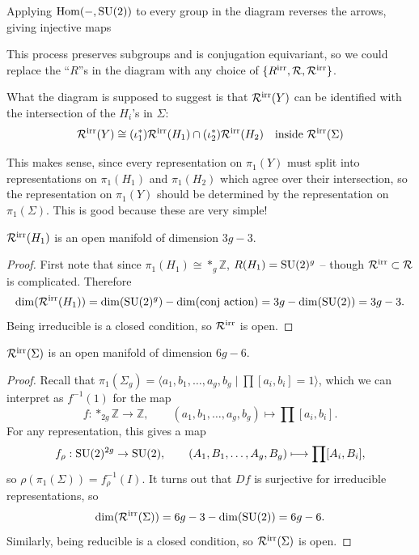 \documentclass[main]{subfiles}
\begin{document}
Applying $\mathrm{Hom}(-,\operatorname{SU}(2))$ to every group in the diagram reverses the arrows, giving injective maps
\begin{center}
\end{center}
This process preserves subgroups and is conjugation equivariant, so we could replace the ``$R$''s in the diagram with any choice of $\{R^{\mathrm{irr}}, \mathcal{R}, \mathcal{R}^{\mathrm{irr}}\}$.

What the diagram is supposed to suggest is that $\mathcal{R}^{\mathrm{irr}}(Y)$ can be identified with the intersection of the $H_i$'s in $\Sigma$:
\[
\mathcal{R}^{\mathrm{irr}}(Y) \cong (\iota_1^\ast)\mathcal{R}^{\mathrm{irr}}(H_1)\cap(\iota_2^\ast)\mathcal{R}^{\mathrm{irr}}(H_2) \quad \text{inside } \mathcal{R}^{\mathrm{irr}}(\Sigma)
\]

This makes sense, since every representation on $\pi_1(Y)$ must split into representations on $\pi_1(H_1)$ and $\pi_1(H_2)$ which agree over their intersection, so the representation on $\pi_1(Y)$ should be determined by the representation on $\pi_1(\Sigma)$. This is good because these are very simple!

\begin{proposition}
$\mathcal{R}^{\mathrm{irr}}(H_1)$ is an open manifold of dimension $3g-3$.
\end{proposition}

\begin{proof}
First note that since $\pi_1(H_1)\cong \ast_g\mathbb{Z}$, $R(H_1) = \operatorname{SU}(2)^g$ -- though $\mathcal{R}^{\mathrm{irr}}\subset\mathcal{R}$ is complicated. Therefore
\[
\dim(\mathcal{R}^{\mathrm{irr}}(H_1)) = \dim(\operatorname{SU}(2)^g) - \dim(\text{conj action}) = 3g - \dim(\operatorname{SU}(2)) = 3g-3.
\]
Being irreducible is a closed condition, so $\mathcal{R}^{\mathrm{irr}}$ is open. \qedhere
\end{proof}

\begin{proposition}
$\mathcal{R}^{\mathrm{irr}}(\Sigma)$ is an open manifold of dimension $6g-6$.
\end{proposition}

\begin{proof}
Recall that $\pi_1(\Sigma_g) = \langle a_1,b_1,\dots,a_g,b_g \mid \prod[a_i,b_i]=1\rangle$, which we can interpret as $f^{-1}(1)$ for the map
\[
f : \mathop{\ast}_{2g}\mathbb{Z}\longrightarrow\mathbb{Z}, \qquad (a_1,b_1,\dots,a_g,b_g)\longmapsto\prod[a_i,b_i].
\]
For any representation, this gives a map
\[
f_\rho : \operatorname{SU}(2)^{2g}\to\operatorname{SU}(2), \qquad (A_1,B_1,\dots,A_g,B_g)\longmapsto\prod[A_i,B_i],
\]
so $\rho(\pi_1(\Sigma)) = f_\rho^{-1}(I)$. It turns out that $Df$ is surjective for irreducible representations, so
\[
\dim(\mathcal{R}^{\mathrm{irr}}(\Sigma)) = 6g-3-\dim(\operatorname{SU}(2)) = 6g-6.
\]
Similarly, being reducible is a closed condition, so $\mathcal{R}^{\mathrm{irr}}(\Sigma)$ is open. \qedhere
\end{proof}
\end{document}
